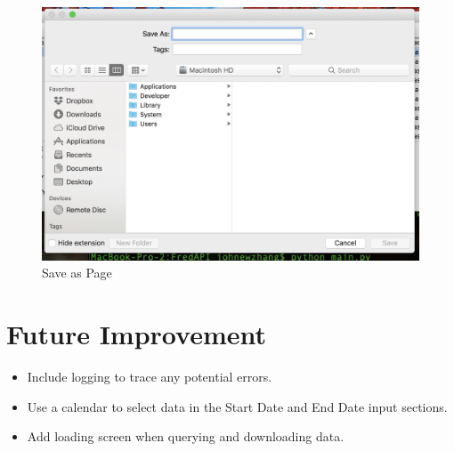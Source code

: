 \documentclass[final,12pt]{elsarticle}
\begin{document}
\begin{figure}[h]
\centering\includegraphics[width=0.5\linewidth]{img/save_as_page.png}
\caption{Save as Page}
\end{figure}



\section{Future Improvement}
\begin{itemize}
\item Include logging to trace any potential errors. 
\item Use a calendar to select data in the Start Date and End Date input sections. 
\item Add loading screen when querying and downloading data. 
\end{itemize}














\end{document}
